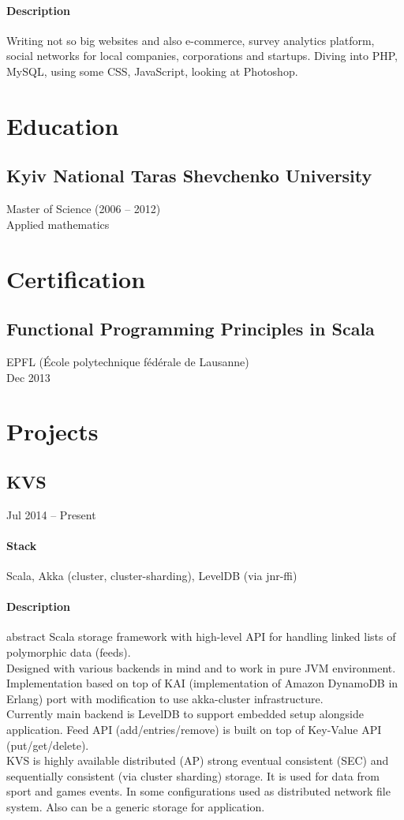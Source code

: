 \paragraph{Description}
Writing not so big websites and also e-commerce, survey analytics platform, social networks for local companies, corporations and startups. Diving into PHP, MySQL, using some CSS, JavaScript, looking at Photoshop.
\section{Education}
\subsection{Kyiv National Taras Shevchenko University}
Master of Science (2006 – 2012)\\
Applied mathematics
\section{Certification}
\subsection{Functional Programming Principles in Scala}
EPFL (École polytechnique fédérale de Lausanne)\\Dec 2013
\section{Projects}
\subsection{KVS}
Jul 2014 – Present
\paragraph{Stack} Scala, Akka (cluster, cluster-sharding), LevelDB (via jnr-ffi)
\paragraph{Description}
 abstract Scala storage framework with high-level API for handling linked lists of polymorphic data (feeds).\\
Designed with various backends in mind and to work in pure JVM environment. Implementation based on top of KAI (implementation of Amazon DynamoDB in Erlang) port with modification to use akka-cluster infrastructure.\\
Currently main backend is LevelDB to support embedded setup alongside application. Feed API (add/entries/remove) is built on top of Key-Value API (put/get/delete).\\
KVS is highly available distributed (AP) strong eventual consistent (SEC) and sequentially consistent (via cluster sharding) storage. It is used for data from sport and games events. In some configurations used as distributed network file system. Also can be a generic storage for application.
